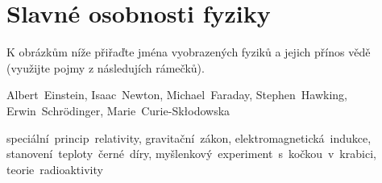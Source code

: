 \documentclass[crop=false]{standalone}
\begin{document}
\section*{Slavné osobnosti fyziky}
K obrázkům níže přiřaďte jména vyobrazených fyziků a jejich přínos vědě (využijte pojmy z následujích rámečků).

\begin{mdframed}[frametitle={Jména}, frametitlealignment=\center, ]
    \begin{center}
        Albert~Einstein, Isaac~Newton, Michael~Faraday, Stephen~Hawking, Erwin~Schrödinger, Marie~Curie-Skłodowska
    \end{center}
\end{mdframed}
\vspace{-0,4cm}
\begin{mdframed}[frametitle={Díla}, frametitlealignment=\center]
    \begin{center}
        speciální~princip~relativity, gravitační~zákon, elektromagnetická~indukce, stanovení~teploty~černé~díry, myšlenkový~experiment~s~kočkou~v~krabici, teorie~radioaktivity
    \end{center}
\end{mdframed}
\end{document}
